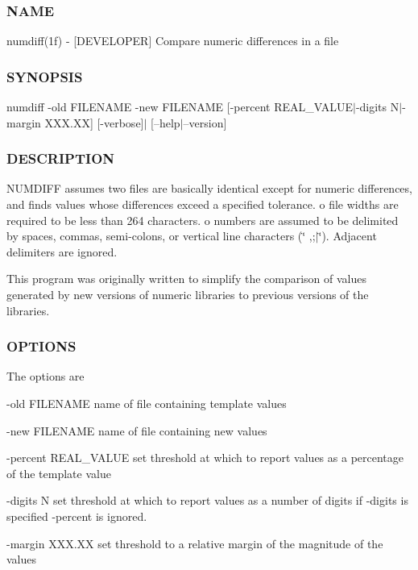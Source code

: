 \subsubsection*{N\+A\+ME}

numdiff(1f) -\/ \mbox{[}D\+E\+V\+E\+L\+O\+P\+ER\mbox{]} Compare numeric differences in a file 

\subsubsection*{S\+Y\+N\+O\+P\+S\+IS}

numdiff -\/old F\+I\+L\+E\+N\+A\+ME -\/new F\+I\+L\+E\+N\+A\+ME \mbox{[}-\/percent R\+E\+A\+L\+\_\+\+V\+A\+L\+U\+E$\vert$-\/digits N$\vert$-\/margin X\+X\+X.\+XX\mbox{]} \mbox{[}-\/verbose\mbox{]}$\vert$ \mbox{[}--help$\vert$--version\mbox{]}

\subsubsection*{D\+E\+S\+C\+R\+I\+P\+T\+I\+ON}

N\+U\+M\+D\+I\+FF assumes two files are basically identical except for numeric differences, and finds values whose differences exceed a specified tolerance. o file widths are required to be less than 264 characters. o numbers are assumed to be delimited by spaces, commas, semi-\/colons, or vertical line characters (\char`\"{} ,;$\vert$\char`\"{}). Adjacent delimiters are ignored.

This program was originally written to simplify the comparison of values generated by new versions of numeric libraries to previous versions of the libraries.

\subsubsection*{O\+P\+T\+I\+O\+NS}

The options are

-\/old F\+I\+L\+E\+N\+A\+ME name of file containing template values

-\/new F\+I\+L\+E\+N\+A\+ME name of file containing new values

-\/percent R\+E\+A\+L\+\_\+\+V\+A\+L\+UE set threshold at which to report values as a percentage of the template value

-\/digits N set threshold at which to report values as a number of digits if -\/digits is specified -\/percent is ignored.

-\/margin X\+X\+X.\+XX set threshold to a relative margin of the magnitude of the values

